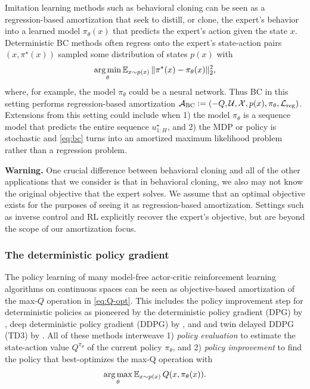 \documentclass[twoside,11pt]{article}
\begin{document}
Imitation learning methods such as behavioral cloning can be
seen as a regression-based amortization
that seek to distill, or clone,
the expert's behavior into a learned model $\pi_\theta(x)$
that predicts the expert's action given the state $x$.
Deterministic BC methods often regress onto the expert's
state-action pairs $(x, \pi^\star(x))$
sampled some distribution of states $p(x)$ with
\begin{equation}
  \operatorname*{arg\,min}_\theta \operatorname{\mathbb{E}}_{x\sim p(x)} \|\pi^\star(x)-\pi_\theta(x)\|_2^2,
  \label{eq:bc}
\end{equation}
where, for example, the model $\pi_\theta$ could
be a neural network.
Thus BC in this setting performs regression-based amortization
${\mathcal{A}}_{\rm BC}\vcentcolon= (-Q, {\mathcal{U}}, {\mathcal{X}}, p(x), \pi_\theta, {\mathcal{L}}_{\rm reg})$.
Extensions from this setting could include when
1) the model $\pi_\theta$ is a sequence model that
predicts the entire sequence $u^\star_{1:H}$, and
2) the MDP or policy is stochastic and
\cref{eq:bc} turns into an amortized maximum likelihood
problem rather than a regression problem.

\textbf{Warning.}
One crucial difference between behavioral cloning
and all of the other applications that we consider
is that in behavioral cloning, we also may not know
the original objective that the expert solves.
We assume that an optimal objective
exists for the purposes of seeing it as regression-based
amortization.
Settings such as inverse control and RL
explicitly recover the expert's objective, but are
beyond the scope of our amortization focus.

\subsubsection{The deterministic policy gradient}
The policy learning of many model-free actor-critic
reinforcement learning algorithms on continuous spaces
can be seen as objective-based amortization of the
max-$Q$ operation in \cref{eq:Q-opt}.
This includes the policy improvement step for
deterministic policies as pioneered by the
deterministic policy gradient (DPG) by \citet{silver2014dpg},
deep deterministic policy gradient (DDPG) by \citet{lillicrap2015continuous},
and and twin delayed DDPG (TD3) by \citet{fujimoto2018td3}.
All of these methods interweave
1) \emph{policy evaluation} to estimate the
state-action value $Q^{\pi_\theta}$ of the current policy
$\pi_\theta$, and
2) \emph{policy improvement} to find the policy
that best-optimizes the max-Q operation with
\begin{equation}
  \operatorname*{arg\,max}_\theta \operatorname{\mathbb{E}}_{x\sim p(x)} Q(x, \pi_\theta(x)).
  \label{eq:dpg-loss}
\end{equation}
\end{document}
